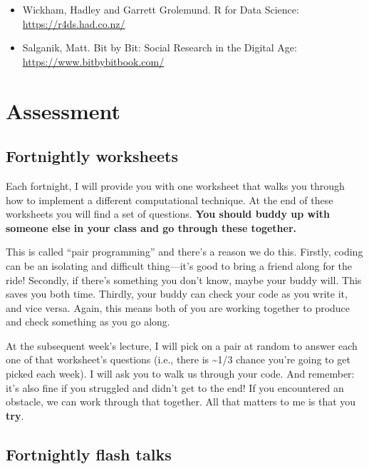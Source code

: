 \documentclass[
  letterpaper,
  DIV=11,
  numbers=noendperiod]{scrreprt}
\providecommand{\tightlist}{%
  \setlength{\itemsep}{0pt}\setlength{\parskip}{0pt}}\usepackage{longtable,booktabs,array}
\begin{document}
\begin{itemize}
\tightlist
\item
  Wickham, Hadley and Garrett Grolemund. R for Data Science:
  \url{https://r4ds.had.co.nz/}
\item
  Salganik, Matt. Bit by Bit: Social Research in the Digital Age:
  \url{https://www.bitbybitbook.com/}
\end{itemize}

\hypertarget{assessment}{%
\section*{Assessment}\label{assessment}}

\hypertarget{fortnightly-worksheets}{%
\subsection*{Fortnightly worksheets}\label{fortnightly-worksheets}}

Each fortnight, I will provide you with one worksheet that walks you
through how to implement a different computational technique. At the end
of these worksheets you will find a set of questions. \textbf{You should
buddy up with someone else in your class and go through these together.}

This is called ``pair programming'' and there's a reason we do this.
Firstly, coding can be an isolating and difficult thing---it's good to
bring a friend along for the ride! Secondly, if there's something you
don't know, maybe your buddy will. This saves you both time. Thirdly,
your buddy can check your code as you write it, and vice versa. Again,
this means both of you are working together to produce and check
something as you go along.

At the subsequent week's lecture, I will pick on a pair at random to
answer each one of that worksheet's questions (i.e., there is
\textasciitilde1/3 chance you're going to get picked each week). I will
ask you to walk us through your code. And remember: it's also fine if
you struggled and didn't get to the end! If you encountered an obstacle,
we can work through that together. All that matters to me is that you
\textbf{try}.

\hypertarget{fortnightly-flash-talks}{%
\subsection*{Fortnightly flash talks}\label{fortnightly-flash-talks}}
\end{document}
